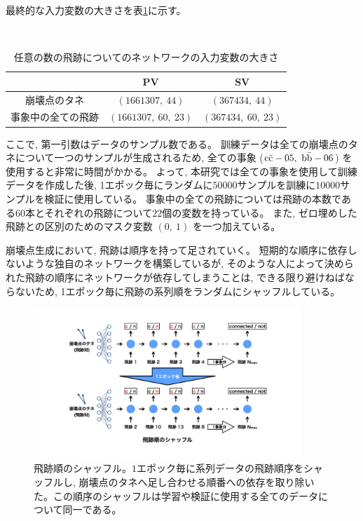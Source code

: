 最終的な入力変数の大きさを表\ref{VLSTMInputParameterShape}に示す。

\begin{table}[htb]
 \centering
　\small
  \begin{tabular}{c | c c}\hline
    & PV & SV\\\hline
    崩壊点のタネ & $(1661307,\ 44)$ & $(367434,\ 44)$\\
    事象中の全ての飛跡 & $(1661307,\ 60,\ 23)$ & $(367434,\ 60,\ 23)$\\\hline
  \end{tabular}
  \caption{任意の数の飛跡についてのネットワークの入力変数の大きさ}
  \label{VLSTMInputParameterShape}
\end{table}

ここで, 第一引数はデータのサンプル数である。
訓練データは全ての崩壊点のタネについて一つのサンプルが生成されるため, 全ての事象 ($\rm c\bar{c}-05,\ \rm b\bar{b}-06$) を使用すると非常に時間がかかる。
よって, 本研究では全ての事象を使用して訓練データを作成した後, 1エポック毎にランダムに$50000$サンプルを訓練に$10000$サンプルを検証に使用している。
事象中の全ての飛跡については飛跡の本数である$60$本とそれぞれの飛跡について$22$個の変数を持っている。
また, ゼロ埋めした飛跡との区別のためのマスク変数 $(0,\ 1)$ を一つ加えている。

崩壊点生成において, 飛跡は順序を持って足されていく。
短期的な順序に依存しないような独自のネットワークを構築しているが, そのような人によって決められた飛跡の順序にネットワークが依存してしまうことは, できる限り避けねばならないため, 1エポック毎に飛跡の系列順をランダムにシャッフルしている。

\begin{figure}[htbp]
 \centering
 \includegraphics[trim = 150 100 150 100, width=0.9\textwidth, clip]{Figure/3Networks/3-4-2-1TrackShuffle.png}
 \caption[飛跡順のシャッフル]{飛跡順のシャッフル。$1$エポック毎に系列データの飛跡順序をシャッフルし, 崩壊点のタネへ足し合わせる順番への依存を取り除いた。この順序のシャッフルは学習や検証に使用する全てのデータについて同一である。}
 \label{3-4-2-1TrackShuffle}
\end{figure}

